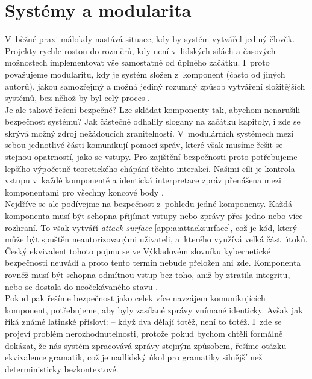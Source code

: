 \section{Systémy a modularita} \label{sec:4:systems}
V~běžné praxi málokdy nastává situace, kdy by systém vytvářel jediný člověk. Projekty rychle rostou do rozměrů, kdy není v~lidských silách a časových 
možnostech implementovat vše samostatně od úplného začátku. I~proto považujeme modularitu, kdy je systém složen z~komponent (často od jiných autorů), 
jakou samozřejmý a možná jediný rozumný způsob vytváření složitějších systémů, bez něhož by byl celý proces  \cite[str. 489]{Sass2013}. \\

Je ale takové řešení bezpečné? Lze skládat komponenty tak, abychom nenarušili bezpečnost systému? Jak částečně odhalily slogany na začátku kapitoly, 
i zde se skrývá možný zdroj nežádoucích zranitelností. V~modulárních systémech mezi sebou jednotlivé části komunikují pomocí zpráv, které však musíme 
řešit se stejnou opatrností, jako se vstupy. Pro zajištění bezpečnosti proto potřebujeme lepšího výpočetně-teoretického chápání těchto interakcí. 
Našimi cíli je kontrola vstupu v~každé komponentě a identická interpretace zpráv přenášena mezi komponentami pro všechny koncové 
body \cite[str. 489]{Sass2013}. \\

Nejdříve se ale podívejme na bezpečnost z~pohledu jedné komponenty.  Každá komponenta musí být schopna přijímat vstupy nebo zprávy přes jedno nebo více 
rozhraní. To však vytváří \textit{attack surface} \ref{app:a:attacksurface}, což je kód, který může být spuštěn neautorizovanými uživateli, a~kterého 
využívá velká část útoků. Český ekvivalent tohoto pojmu se ve Výkladovém slovníku kybernetické bezpečnosti neuvádí a proto tento termín nebude přeložen 
ani zde. Komponenta rovněž musí být schopna odmítnou vstup bez toho, aniž by ztratila integritu, nebo se dostala do neočekávaného 
stavu \cite[str. 490]{Sass2013}. \\

Pokud pak řešíme bezpečnost jako celek více navzájem komunikujících komponent, potřebujeme, aby byly zasílané zprávy vnímané identicky. Avšak jak říká 
známé latinské přísloví: \textit{} -- když dva dělají totéž, není to totéž. I~zde se projeví problém 
nerozhodnutelnosti, protože pokud bychom chtěli formálně dokázat, že nás systém zpracovává zprávy stejným způsobem, řešíme otázku ekvivalence gramatik, 
což je nadlidský úkol pro gramatiky silnější než deterministicky bezkontextové. \\ 

